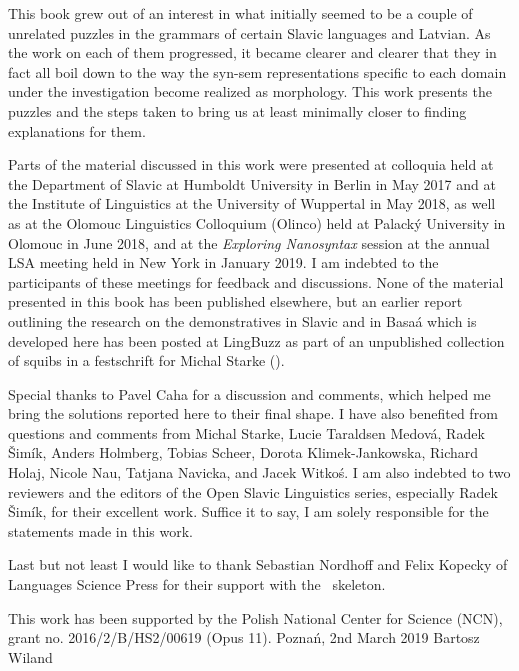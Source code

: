 
This book grew out of an interest in what initially seemed to be a couple of unrelated puzzles in the grammars of certain Slavic languages and Latvian. As the work on each of them progressed, it became clearer and clearer that they in fact all boil down to the way the syn-sem representations specific to each domain under the investigation become realized as morphology. This work presents the puzzles and the steps taken to bring us at least minimally closer to finding explanations for them.
\par
Parts of the material discussed in this work were presented at colloquia held at the Department of Slavic at Humboldt University in Berlin in May 2017 and at the Institute of Linguistics at the University of Wuppertal in May 2018, as well as at the Olomouc Linguistics Colloquium (Olinco) held at Palack\'y University in Olomouc in June 2018, and at the \textit{Exploring Nanosyntax} session at the annual LSA meeting held in New York in January 2019. I am indebted to the participants of these meetings for feedback and discussions. None of the material presented in this book has been published elsewhere, but an earlier report outlining the research on the demonstratives in Slavic and in Basa\'a which is developed here has been posted at LingBuzz as part of an unpublished collection of squibs in a festschrift for Michal Starke (\citealt{WilandTUM}). 
\par 
Special thanks to  Pavel Caha for a discussion and comments, which helped me bring the solutions reported here to their final shape.
I have also benefited from questions and comments from  Michal Starke,   Lucie Taraldsen Medov\'a,   Radek \v{S}im\'ik,   Anders Holmberg,  Tobias Scheer,   Dorota Klimek-Jankowska,  Richard Holaj,  Nicole Nau,   Tatjana Navicka, and  Jacek Witko\'s. I am also indebted to two reviewers and the editors of the Open Slavic Linguistics series, especially Radek \v{S}im\'ik, for their excellent work. Suffice it to say, I am solely responsible for the statements made in this work. 
\par
Last but not least I would like to thank  Sebastian Nordhoff  and Felix Kopecky  of Languages Science Press for their support with the \XeLaTeX \ skeleton.
 \par
 This work has been supported by the Polish National Center for Science (NCN), grant no. 2016/2/B/HS2/00619 (Opus 11).
\bigbreak
\noindent 
Pozna\'n, 2nd March 2019 \hfill Bartosz Wiland


\begin{refsection}
\printbibliography[heading=subbibliography]
\end{refsection}

